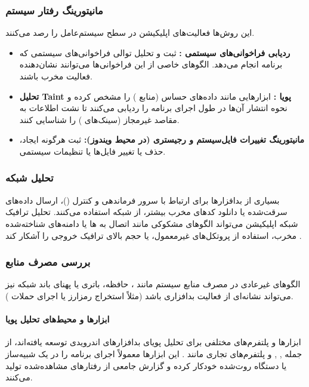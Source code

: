 \subsubsection{مانیتورینگ رفتار سیستم}
این روش‌ها فعالیت‌های اپلیکیشن در سطح سیستم‌عامل را رصد می‌کنند.
\begin{itemize}
    \item \textbf{ردیابی فراخوانی‌های سیستمی :} ثبت و تحلیل توالی فراخوانی‌های سیستمی که برنامه انجام می‌دهد. الگوهای خاصی از این فراخوانی‌ها می‌توانند نشان‌دهنده فعالیت مخرب باشند.
    \item \textbf{تحلیل Taint پویا :} ابزارهایی مانند  \cite{TaintDroid} داده‌های حساس (منابع ) را مشخص کرده و نحوه انتشار آن‌ها در طول اجرای برنامه را ردیابی می‌کنند تا نشت اطلاعات به مقاصد غیرمجاز (سینک‌های ) را شناسایی کنند.
    \item \textbf{مانیتورینگ تغییرات فایل‌سیستم و رجیستری (در محیط ویندوز):} ثبت هرگونه ایجاد، حذف یا تغییر فایل‌ها یا تنظیمات سیستمی.
\end{itemize}

\subsubsection{تحلیل شبکه}
بسیاری از بدافزارها برای ارتباط با سرور فرماندهی و کنترل ()، ارسال داده‌های سرقت‌شده یا دانلود کدهای مخرب بیشتر، از شبکه استفاده می‌کنند. تحلیل ترافیک شبکه اپلیکیشن می‌تواند الگوهای مشکوکی مانند اتصال به ها یا دامنه‌های شناخته‌شده مخرب، استفاده از پروتکل‌های غیرمعمول، یا حجم بالای ترافیک خروجی را آشکار کند \cite{NetworkAnalysis}.

\subsubsection{بررسی مصرف منابع}
الگوهای غیرعادی در مصرف منابع سیستم مانند ، حافظه، باتری یا پهنای باند شبکه نیز می‌تواند نشانه‌ای از فعالیت بدافزاری باشد (مثلاً استخراج رمزارز یا اجرای حملات ).

\paragraph{ابزارها و محیط‌های تحلیل پویا}
ابزارها و پلتفرم‌های مختلفی برای تحلیل پویای بدافزارهای اندرویدی توسعه یافته‌اند، از جمله , ,  و پلتفرم‌های تجاری مانند . این ابزارها معمولاً اجرای برنامه را در یک شبیه‌ساز یا دستگاه روت‌شده خودکار کرده و گزارش جامعی از رفتارهای مشاهده‌شده تولید می‌کنند.

